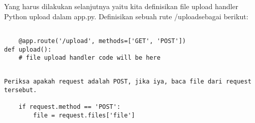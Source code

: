 \documentclass[12pt,a4paper]{article}
\begin{document}
Yang harus dilakukan selanjutnya yaitu kita definisikan file upload handler Python upload dalam app.py. Definisikan sebuah rute /uploadsebagai berikut:


\begin{verbatim}

	@app.route('/upload', methods=['GET', 'POST'])
def upload():
    # file upload handler code will be here
    
\end{verbatim}
    

\begin{verbatim}    
Periksa apakah request adalah POST, jika iya, baca file dari request tersebut.

	if request.method == 'POST':
        file = request.files['file']
        
\end{verbatim}
\end{document}
